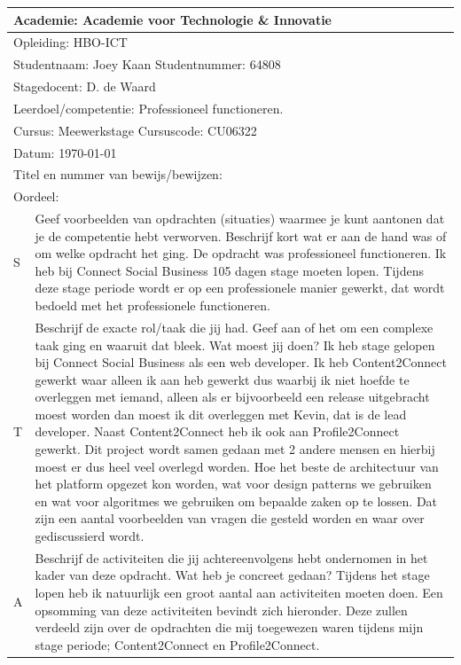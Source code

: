 \begin{tabularx}{\textwidth}{| l | X |}
\hline
\multicolumn{2}{|l|}{Academie: Academie voor Technologie \& Innovatie } \\
\hline
\multicolumn{2}{|l|}{Opleiding: HBO-ICT } \\
\hline
\multicolumn{2}{|l|}{Studentnaam: Joey Kaan \hspace{35pt} Studentnummer: 64808} \\
\hline
\multicolumn{2}{|l|}{Stagedocent: D. de Waard} \\
\hline
\multicolumn{2}{|p{\textwidth-1in}|}{Leerdoel/competentie: Professioneel functioneren.} \\
\hline
\multicolumn{2}{|l|}{Cursus: Meewerkstage \hspace{35pt} Cursuscode: CU06322} \\
\hline
\multicolumn{2}{|l|}{Datum: \today} \\
\hline
\multicolumn{2}{|l|}{Titel en nummer van bewijs/bewijzen: } \\ [50pt]
\hline
\multicolumn{2}{|l|}{Oordeel: } \\
\hline
S & Geef voorbeelden van opdrachten (situaties) waarmee je kunt aantonen dat je de competentie hebt verworven. Beschrijf kort wat er aan de hand was of om welke opdracht het ging.
\newline
\newline
De opdracht was professioneel functioneren. Ik heb bij Connect Social Business 105 dagen stage moeten lopen. Tijdens deze stage periode wordt er op een professionele manier gewerkt, dat wordt bedoeld met het professionele functioneren.
\\
\hline
T & Beschrijf de exacte rol/taak die jij had. Geef aan of het om een complexe taak ging en waaruit dat bleek. Wat moest jij doen?
\newline
\newline
Ik heb stage gelopen bij Connect Social Business als een web developer. Ik heb Content2Connect gewerkt waar alleen ik aan heb gewerkt dus waarbij ik niet hoefde te overleggen met iemand, alleen als er bijvoorbeeld een release uitgebracht moest worden dan moest ik dit overleggen met Kevin, dat is de lead developer. Naast Content2Connect heb ik ook aan Profile2Connect gewerkt. Dit project wordt samen gedaan met 2 andere mensen en hierbij moest er dus heel veel overlegd worden. Hoe het beste de architectuur van het platform opgezet kon worden, wat voor design patterns we gebruiken en wat voor algoritmes we gebruiken om bepaalde zaken op te lossen. Dat zijn een aantal voorbeelden van vragen die gesteld worden en waar over gediscussierd wordt.
\\
\hline
A & Beschrijf de activiteiten die jij achtereenvolgens hebt ondernomen in het kader van deze opdracht. Wat heb je concreet gedaan?
\newline
\newline
Tijdens het stage lopen heb ik natuurlijk een groot aantal aan activiteiten moeten doen. Een opsomming van deze activiteiten bevindt zich hieronder. Deze zullen verdeeld zijn over de opdrachten die mij toegewezen waren tijdens mijn stage periode; Content2Connect en Profile2Connect.


\end{tabularx}
